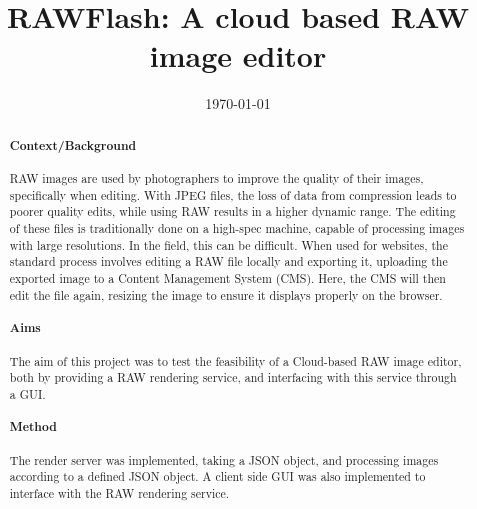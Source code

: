 \documentclass[11pt,a4paper]{article}
\title{RAWFlash: A cloud based RAW image editor}
\author{} %
\date{\today}
\begin{document}
\maketitle

\begin{abstract}

\paragraph{Context/Background}
RAW images are used by photographers to improve the quality of their images, specifically when editing. With JPEG files, the loss of 
data from compression leads to poorer quality edits, while using RAW results in a higher dynamic range. The editing of these files is 
traditionally done on a high-spec machine, capable of processing images with large resolutions. In the field, this can be difficult. 
When used for websites, the standard process involves editing a RAW file locally and exporting it, uploading the exported image to a 
Content Management System (CMS). Here, the CMS will then edit the file again, resizing the image to ensure it displays properly on the
browser. 


\paragraph{Aims}
The aim of this project was to test the feasibility of a Cloud-based RAW image editor, both by providing a RAW rendering
service, and interfacing with this service through a GUI. 


\paragraph{Method}
The render server was implemented, taking a JSON object, and processing images according to a defined JSON object.
A client side GUI was also implemented to interface with the RAW rendering service.



\end{abstract}
\end{document}

